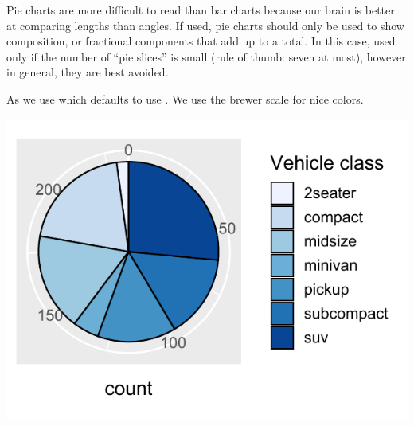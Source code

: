 \documentclass[krantz2]{krantz}\usepackage{knitr}
\begin{document}
\begin{warningbox}
Pie charts are more difficult to read than bar charts because our brain is better at comparing lengths than angles. If used, pie charts should only be used to show composition, or fractional components that add up to a total. In this case, used only if the number of “pie slices” is small (rule of thumb: seven at most), however in general, they are best avoided.
\end{warningbox}

As we use  which defaults to use . We use the brewer scale for nice colors.

\begin{knitrout}\footnotesize
{}\color{fgcolor}\begin{kframe}
\begin{alltt}
\hlstd{(}  \hlstd{(} \hlstd{=} \hlstd{(}\hlstd{),}  \hlstd{=}  \hlopt{+}
  \hlstd{(} \hlstd{=} \hlstd{,}  \hlstd{=} \hlstd{)} \hlopt{+}
  \hlstd{(} \hlstd{=} \hlstd{)} \hlopt{+}
  \hlstd{()} \hlopt{+}
  \hlstd{(} \hlstd{=} \hlstd{)} \hlopt{+}
  \hlstd{(} \hlstd{=} \hlstd{,}  \hlstd{=} \hlstd{)}
\end{alltt}
\end{kframe}

{\centering \includegraphics[width=.54\textwidth]{figure/pos-main-chunk-55-1} 

}


\end{knitrout}
\end{document}
